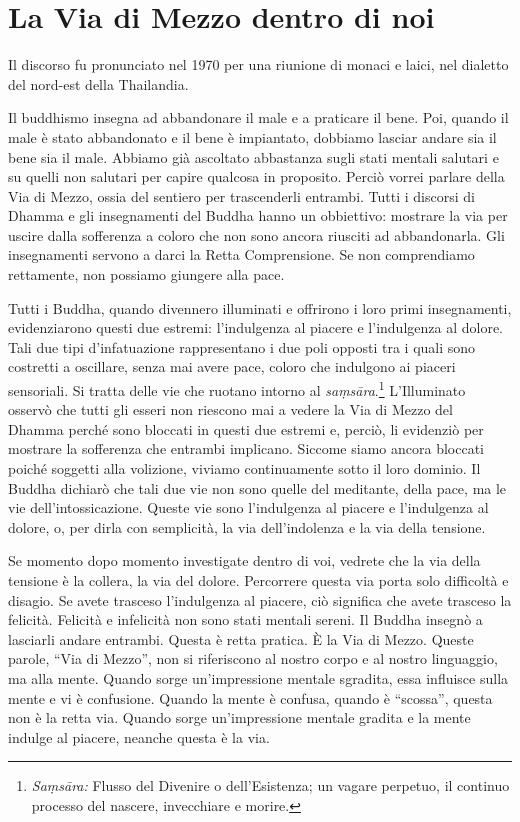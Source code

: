 \chapter{La Via di Mezzo dentro di noi}

\begin{openingQuote}
  \centering

  Il discorso fu pronunciato nel 1970 per una riunione di monaci e
  laici, nel dialetto del nord-est della Thailandia.
\end{openingQuote}

Il buddhismo insegna ad abbandonare il male e a praticare il bene. Poi,
quando il male è stato abbandonato e il bene è impiantato, dobbiamo
lasciar andare sia il bene sia il male. Abbiamo già ascoltato abbastanza
sugli stati mentali salutari e su quelli non salutari per capire
qualcosa in proposito. Perciò vorrei parlare della Via di Mezzo, ossia
del sentiero per trascenderli entrambi. Tutti i discorsi di Dhamma e gli
insegnamenti del Buddha hanno un obbiettivo: mostrare la via per uscire
dalla sofferenza a coloro che non sono ancora riusciti ad abbandonarla.
Gli insegnamenti servono a darci la Retta Comprensione. Se non
comprendiamo rettamente, non possiamo giungere alla pace.

Tutti i Buddha, quando divennero illuminati e offrirono i loro primi
insegnamenti, evidenziarono questi due estremi: l'indulgenza al piacere
e l'indulgenza al dolore. Tali due tipi d'infatuazione rappresentano i
due poli opposti tra i quali sono costretti a oscillare, senza mai avere
pace, coloro che indulgono ai piaceri sensoriali. Si tratta delle vie
che ruotano intorno al \emph{saṃsāra}.\footnote{%
  \emph{Saṃsāra:} Flusso del Divenire o dell'Esistenza; un vagare
  perpetuo, il continuo processo del nascere, invecchiare e morire.}
L'Illuminato osservò che tutti gli esseri non riescono
mai a vedere la Via di Mezzo del Dhamma perché sono bloccati in questi
due estremi e, perciò, li evidenziò per mostrare la sofferenza che
entrambi implicano. Siccome siamo ancora bloccati poiché soggetti alla
volizione, viviamo continuamente sotto il loro dominio. Il Buddha
dichiarò che tali due vie non sono quelle del meditante, della pace, ma
le vie dell'intossicazione. Queste vie sono l'indulgenza al piacere e
l'indulgenza al dolore, o, per dirla con semplicità, la via
dell'indolenza e la via della tensione.

Se momento dopo momento investigate dentro di voi, vedrete che la via
della tensione è la collera, la via del dolore. Percorrere questa via
porta solo difficoltà e disagio. Se avete trasceso l'indulgenza al
piacere, ciò significa che avete trasceso la felicità. Felicità e
infelicità non sono stati mentali sereni. Il Buddha insegnò a lasciarli
andare entrambi. Questa è retta pratica. È la Via di Mezzo. Queste
parole, ``Via di Mezzo'', non si riferiscono al nostro corpo e al nostro
linguaggio, ma alla mente. Quando sorge un'impressione mentale sgradita,
essa influisce sulla mente e vi è confusione. Quando la mente è confusa,
quando è ``scossa'', questa non è la retta via. Quando sorge
un'impressione mentale gradita e la mente indulge al piacere, neanche
questa è la via.

